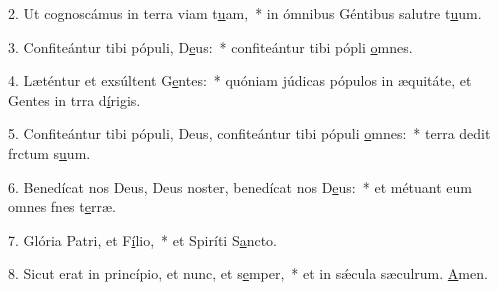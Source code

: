 2. Ut cognoscámus in terra viam t\uline{u}am,~* in ómnibus Géntibus salutre t\uline{u}um.\par 
3. Confiteántur tibi pópuli, D\uline{e}us:~* confiteántur tibi pópli \uline{o}mnes.\par 
4. Læténtur et exsúltent G\uline{e}ntes:~* quóniam júdicas pópulos in æquitáte, et Gentes in trra d\uline{í}rigis.\par 
5. Confiteántur tibi pópuli, Deus, confiteántur tibi pópuli \uline{o}mnes:~* terra dedit frctum s\uline{u}um.\par 
6. Benedícat nos Deus, Deus noster, benedícat nos D\uline{e}us:~* et métuant eum omnes fnes t\uline{e}rræ.\par 
7. Glória Patri, et F\uline{í}lio,~* et Spiríti S\uline{a}ncto.\par 
8. Sicut erat in princípio, et nunc, et s\uline{e}mper,~* et in sǽcula sæculrum. \uline{A}men.\par 
